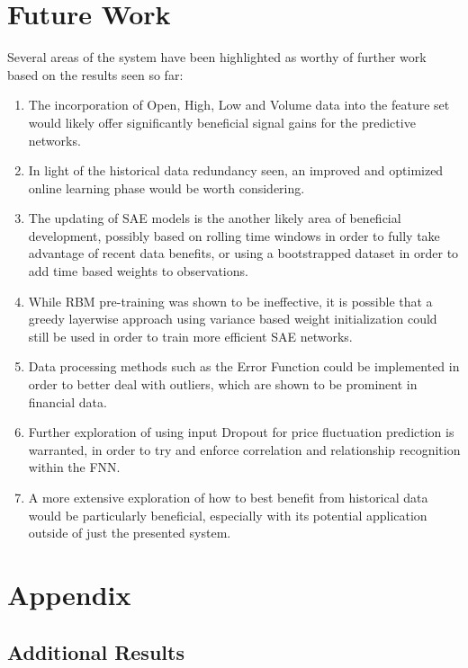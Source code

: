 \documentclass[a4paper,11pt,oneside]{article}
\theoremstyle{plain}
\theoremstyle{definition}
\begin{document}
	\newpage
	\section{Future Work}
	
	Several areas of the system have been highlighted as worthy of further work based on the results seen so far: 
	\begin{enumerate}
		\item The incorporation of Open, High, Low and Volume data into the feature set would likely offer significantly beneficial signal gains for the predictive networks.
		\item In light of the historical data redundancy seen, an improved and optimized online learning phase would be worth considering.
		\item The updating of SAE models is the another likely area of beneficial development, possibly based on rolling time windows in order to fully take advantage of recent data benefits, or using a bootstrapped dataset in order to add time based weights to observations.
		\item While RBM pre-training was shown to be ineffective, it is possible that a greedy layerwise approach using variance based weight initialization could still be used in order to train more efficient SAE networks.
		\item Data processing methods such as the Error Function could be implemented in order to better deal with outliers, which are shown to be prominent in financial data.
		\item Further exploration of using input Dropout for price fluctuation prediction is warranted, in order to try and enforce correlation and relationship recognition within the FNN.
		\item A more extensive exploration of how to best benefit from historical data would be particularly beneficial, especially with its potential application outside of just the presented system.
	\end{enumerate}
	
	\newpage
	\section{Appendix}\label{Appendix}
	
	\subsection{Additional Results}
	
\end{document}
